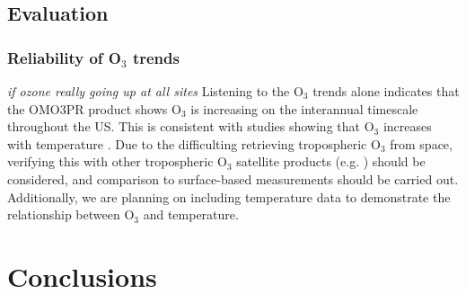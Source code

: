 \documentclass[a4paper,10pt,oneside]{article}
\newcommand{\ce}[1]{$\mathrm{#1}$}
\begin{document}
\begin{sloppy}
\subsection{Evaluation}
\subsubsection{Reliability of O$_3$ trends}
\emph{if ozone really going up at all sites} Listening to the \ce{O_3} trends alone indicates that the OMO3PR product shows \ce{O_3} is increasing on the interannual timescale throughout the US. This is consistent with studies showing that \ce{O_3} increases with temperature \cite{lin17}. Due to the difficulting retrieving tropospheric \ce{O_3} from space, verifying this with other tropospheric \ce{O_3} satellite products (e.g. \cite{choi08}) should be considered, and comparison to surface-based measurements should be carried out. Additionally, we are planning on including temperature data to demonstrate the relationship between \ce{O_3} and temperature.

\section{Conclusions}










\end{sloppy}
\end{document}
